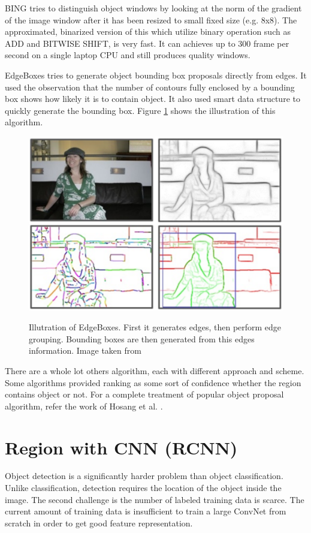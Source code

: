 \documentclass[a4paper,11pt]{kth-mag}
\begin{document}
BING \cite{bing} tries to distinguish object windows by looking at the norm of the gradient of the image window after it has been resized to small fixed size (e.g. 8x8). The approximated, binarized version of this which utilize binary operation such as ADD and BITWISE SHIFT, is very fast. It can achieves up to 300 frame per second on a single laptop CPU and still produces quality windows.

EdgeBoxes \cite{zitnick2014edgeboxes} tries to generate object bounding box proposals directly from edges. It used the observation that the number of contours fully enclosed by a bounding box shows how likely it is to contain object. It also used smart data structure to quickly generate the bounding box. Figure \ref{fig:edgeboxes} shows the illustration of this algorithm.

\begin{figure}[h]
\centering
\includegraphics[scale=0.5]{image/edgeboxes.png}
\label{fig:edgeboxes}
\caption{Illutration of EdgeBoxes. First it generates edges, then perform edge grouping. Bounding boxes are then generated from this edges information. Image taken from \cite{zitnick2014edgeboxes}}
\end{figure}

There are a whole lot others algorithm, each with different approach and scheme. Some algorithms provided ranking as some sort of confidence whether the region contains object or not. For a complete treatment of popular object proposal algorithm, refer the work of Hosang et al. \cite{hosang}.

\section{Region with CNN (RCNN)}
Object detection is a significantly harder problem than object classification. Unlike classification, detection requires the location of the object inside the image. The second challenge is the number of labeled training data is scarce. The current amount of training data is insufficient to train a large ConvNet from scratch in order to get good feature representation.
\end{document}
